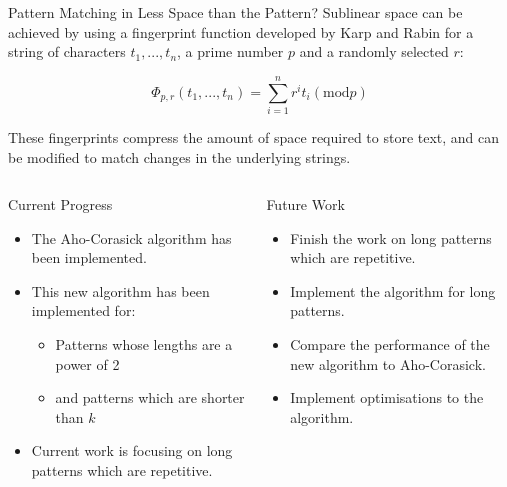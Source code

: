 \documentclass[ %
                    author={Dominic Moylett},
                supervisor={Dr. Raphael Clifford and Dr. Benjamin Sach},
                    degree={MEng},
                     title={Dictionary Matching with Fingerprints},
                  subtitle={},
                      type={research},
                      year={2015} ]{poster}
\begin{document}
\begin{frame}{}
\begin{columns}[t]
  \begin{column}{0.422\linewidth}
  \begin{block}{\Large Pattern Matching in Less Space than the Pattern?}
  Sublinear space can be achieved by using a fingerprint function developed by Karp and Rabin for a string of characters $t_1,...,t_n$, a prime number $p$ and a randomly selected $r$:

  $$\Phi_{p, r}(t_1,...,t_n) = \sum_{i = 1}^{n}r^it_i (\text{mod} p)$$

  These fingerprints compress the amount of space required to store text, and can be modified to match changes in the underlying strings.
  \end{block}
  \end{column}
\end{columns}

\vfill

\begin{columns}[t]
  \begin{column}{0.422\linewidth}
  \begin{block}{\Large Current Progress}
  \begin{itemize}
  \item The Aho-Corasick algorithm has been implemented.
  \item This new algorithm has been implemented for:
    \begin{itemize}
    \item Patterns whose lengths are a power of 2
    \item and patterns which are shorter than $k$
    \end{itemize}
  \item Current work is focusing on long patterns which are repetitive.
  \end{itemize}
  \end{block}
  \end{column}
  \begin{column}{0.422\linewidth}
  \begin{block}{\Large Future Work}
  \begin{itemize}
  \item Finish the work on long patterns which are repetitive.
  \item Implement the algorithm for long patterns.
  \item Compare the performance of the new algorithm to Aho-Corasick.
  \item Implement optimisations to the algorithm.
  \end{itemize}
  \end{block}
  \end{column}
\end{columns}

\vfill

\end{frame}

\end{document}
